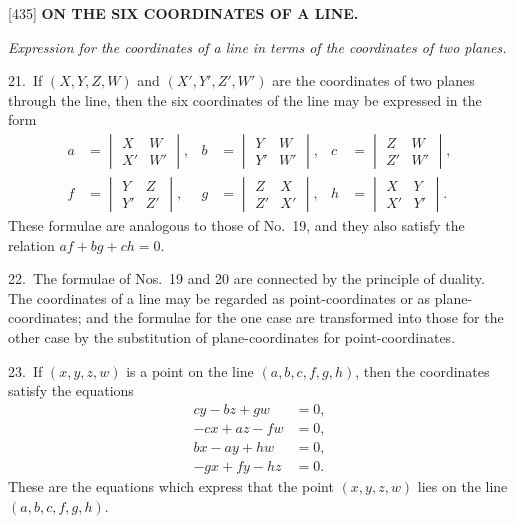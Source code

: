 \documentclass[12pt,a4paper]{article}
\newcommand{\paperref}[1]{\textup{[#1]}}
\theoremstyle{definition}
\begin{document}
\newpage
\setcounter{page}{75}

\noindent\paperref{435}\quad
\textbf{ON THE SIX COORDINATES OF A LINE.}

\textit{Expression for the coordinates of a line in terms of the coordinates of two planes.}

21.~If $(X, Y, Z, W)$ and $(X', Y', Z', W')$ are the coordinates of two planes through the line, then the six coordinates of the line may be expressed in the form
\begin{align*}
a &= \begin{vmatrix} X & W \\ X' & W' \end{vmatrix},
& b &= \begin{vmatrix} Y & W \\ Y' & W' \end{vmatrix},
& c &= \begin{vmatrix} Z & W \\ Z' & W' \end{vmatrix},\\
f &= \begin{vmatrix} Y & Z \\ Y' & Z' \end{vmatrix},
& g &= \begin{vmatrix} Z & X \\ Z' & X' \end{vmatrix},
& h &= \begin{vmatrix} X & Y \\ X' & Y' \end{vmatrix}.
\end{align*}
These formulae are analogous to those of No.~19, and they also satisfy the relation $af + bg + ch = 0$.

22.~The formulae of Nos.~19 and 20 are connected by the principle of duality. The coordinates of a line may be regarded as point-coordinates or as plane-coordinates; and the formulae for the one case are transformed into those for the other case by the substitution of plane-coordinates for point-coordinates.

23.~If $(x, y, z, w)$ is a point on the line $(a, b, c, f, g, h)$, then the coordinates satisfy the equations
\begin{align*}
c y - b z + g w &= 0,\\
-c x + a z - f w &= 0,\\
b x - a y + h w &= 0,\\
-g x + f y - h z &= 0.
\end{align*}
These are the equations which express that the point $(x, y, z, w)$ lies on the line $(a, b, c, f, g, h)$.
\end{document}
